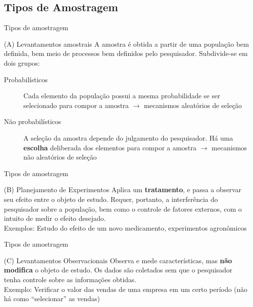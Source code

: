 \documentclass[10pt]{beamer}
\theoremstyle{definition}
\begin{document}
\subsection[Tipos]{Tipos de Amostragem}

\begin{frame}{Tipos de amostragem}
  \begin{block}{(A) Levantamentos amostrais}
    A amostra é obtida a partir de uma população bem definida, bem meio
    de processos bem definidos pelo pesquisador. Subdivide-se em dois
    grupos:
    \begin{description}
    \item[Probabilísticos] Cada elemento da população possui a
    mesma probabilidade se ser selecionado para compor a amostra
    $\rightarrow$ mecanismos aleatórios de seleção
  \item[Não probabilísticos] A seleção da amostra depende do julgamento
    do pesquisador. Há uma \textbf{escolha} deliberada dos elementos
    para compor a amostra $\rightarrow$ mecanismos não aleatórios de
    seleção
    \end{description}
  \end{block}
\end{frame}

\begin{frame}{Tipos de amostragem}
  \begin{block}{(B) Planejamento de Experimentos}
    Aplica um \textbf{tratamento}, e passa a observar seu efeito entre
    o objeto de estudo. Requer, portanto, a interferência do pesquisador
    sobre a população, bem como o controle de fatores externos, com o
    intuito de medir o efeito desejado.\\
    \vspace{1em}
    Exemplos: Estudo do efeito de um novo medicamento, experimentos
    agronômicos
  \end{block}
\end{frame}

\begin{frame}{Tipos de amostragem}
  \begin{block}{(C) Levantamentos Observacionais}
    Observa e mede características, mas \textbf{não modifica} o objeto
    de estudo. Os dados são coletados sem que o pesquisador tenha
    controle sobre as informações obtidas. \\
    \vspace{1em}
    Exemplo: Verificar o valor das vendas de uma empresa em um certo
    período (não há como ``selecionar'' as vendas)
  \end{block}
\end{frame}
\end{document}
